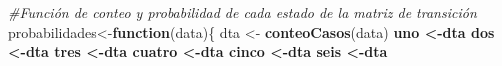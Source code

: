 \documentclass{article}
\newenvironment{Shaded}{\begin{snugshade}}{\end{snugshade}}
\newcommand{\CommentTok}[1]{\textcolor[rgb]{0.56,0.35,0.01}{\textit{#1}}}
\newcommand{\ControlFlowTok}[1]{\textcolor[rgb]{0.13,0.29,0.53}{\textbf{#1}}}
\newcommand{\DataTypeTok}[1]{\textcolor[rgb]{0.13,0.29,0.53}{#1}}
\newcommand{\DecValTok}[1]{\textcolor[rgb]{0.00,0.00,0.81}{#1}}
\newcommand{\KeywordTok}[1]{\textcolor[rgb]{0.13,0.29,0.53}{\textbf{#1}}}
\newcommand{\NormalTok}[1]{#1}
\newcommand{\OperatorTok}[1]{\textcolor[rgb]{0.81,0.36,0.00}{\textbf{#1}}}
\newcommand{\StringTok}[1]{\textcolor[rgb]{0.31,0.60,0.02}{#1}}
\begin{document}
\begin{Shaded}
\begin{Highlighting}[]
\CommentTok{#Función de conteo y probabilidad de cada estado de la matriz de transición}
\NormalTok{probabilidades<-}\ControlFlowTok{function}\NormalTok{(data)\{}
\NormalTok{  dta <-}\StringTok{ }\KeywordTok{conteoCasos}\NormalTok{(data) }\OperatorTok{%
\NormalTok{    uno <-dta }\OperatorTok{%
\NormalTok{    dos <-dta }\OperatorTok{%
\NormalTok{    tres <-dta }\OperatorTok{%
\NormalTok{    cuatro <-dta }\OperatorTok{%
\NormalTok{    cinco <-dta }\OperatorTok{%
\NormalTok{    seis <-dta }\OperatorTok{%
}}}}}}}
\end{Highlighting}
\end{Shaded}
\end{document}
